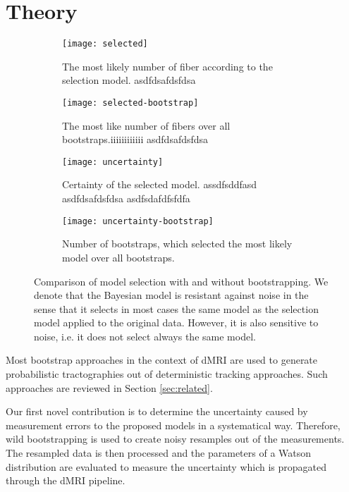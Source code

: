 \section{Theory}
\begin{figure*}[t]
	\centering
	\begin{subfigure}[b]{0.24\linewidth}
		\texttt{[image: selected]}
		\caption{The most likely number of fiber according to the
		selection model. {\color{white}asdfdsafdsfdsa}}
		\label{fig:selected-uncertainty:rank-original}
	\end{subfigure}
	\begin{subfigure}[b]{0.24\linewidth}
		\texttt{[image: selected-bootstrap]}
		\caption{The most like number of fibers over all
		bootstraps.{\color{white}iiiiiiiiiiii asdfdsafdsfdsa}}
		\label{fig:selected-uncertainty:rank}
\end{subfigure}  
	\begin{subfigure}[b]{0.24\linewidth}
		\texttt{[image: uncertainty]}
		\caption{Certainty of the selected model.
		{\color{white}assdfsddfasd asdfdsafdsfdsa asdfsdafdfsfdfa}}
		
		\label{fig:selected-uncertainty:unc-original}
	\end{subfigure}
	\begin{subfigure}[b]{0.24\linewidth}
		\texttt{[image: uncertainty-bootstrap]}
		\caption{Number of bootstraps, which selected the most likely
		model over all bootstraps.}
		\label{fig:selected-uncertainty:unc}
	\end{subfigure}
	\caption{Comparison of model selection with and without bootstrapping.
	We denote that the Bayesian model is resistant against noise in the
sense that it selects in most cases the same model as the selection model
applied to the original data. However, it is also sensitive to noise, i.e. it
does not select always the same model.}
	\label{fig:selected-uncertainty}
\end{figure*}

Most bootstrap approaches in the context of dMRI are used  to generate
probabilistic tractographies out of deterministic tracking approaches. Such
approaches are reviewed in Section \ref{sec:related}. 

Our first novel contribution is to determine the uncertainty caused by
measurement errors to the proposed models in a systematical way. Therefore, wild bootstrapping is used to create
noisy resamples out of the measurements. The resampled data is then processed
and the parameters of a Watson distribution are evaluated to measure the
uncertainty which is propagated through the dMRI pipeline. 


